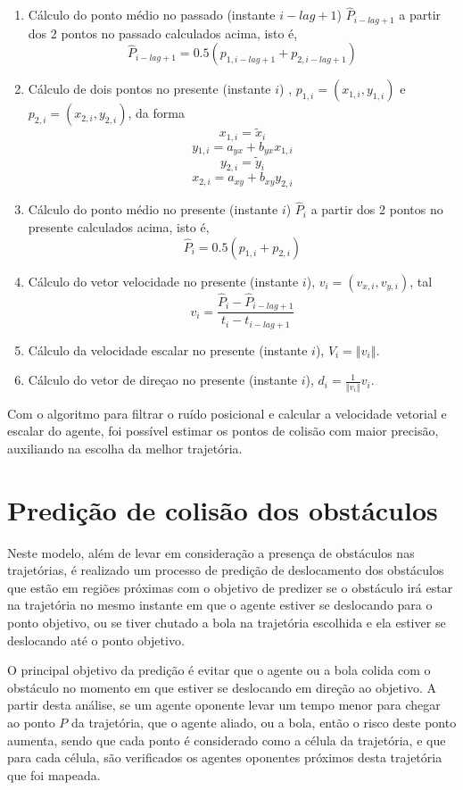 \begin{enumerate}
\begin{enumerate}
\item Cálculo do ponto médio no passado (instante $i-lag+1$) $\hat{P}_{i-lag+1}$
a partir dos 2 pontos no passado calculados acima, isto é,
\[
\hat{P}_{i-lag+1}=0.5\left(p_{1,i-lag+1}+p_{2,i-lag+1}\right)
\]

\item Cálculo de dois pontos no presente (instante $i$) , $p_{1,i}=\left(x_{1,i},y_{1,i}\right)$
e $p_{2,i}=\left(x_{2,i},y_{2,i}\right)$, da forma
\[
x_{1,i}=\tilde{x}_{i}
\]
\[
y{}_{1,i}=a_{yx}+b_{yx}x_{1,i}
\]
\[
y_{2,i}=\tilde{y}_{i}
\]
\[
x_{2,i}=a_{xy}+b_{xy}y_{2,i}
\]

\item Cálculo do ponto médio no presente (instante $i$) $\hat{P}_{i}$
a partir dos 2 pontos no presente calculados acima, isto é,
\[
\hat{P}_{i}=0.5\left(p_{1,i}+p_{2,i}\right)
\]

\item Cálculo do vetor velocidade no presente (instante $i$), $v_{i}=\left(v_{x,i},v_{y,i}\right)$,
tal 
\[
v_{i}=\frac{\hat{P}_{i}-\hat{P}_{i-lag+1}}{t_{i}-t_{i-lag+1}}
\]

\item Cálculo da velocidade escalar no presente (instante $i$), $V_{i}=\left\Vert v_{i}\right\Vert $.
\item Cálculo do vetor de direçao no presente (instante $i$), $d_{i}={\displaystyle \frac{1}{\left\Vert v_{i}\right\Vert }}v_{i}$.\end{enumerate}
\end{enumerate}


Com o algoritmo para filtrar o ruído posicional e calcular a velocidade vetorial e escalar do agente, foi possível estimar os 
pontos de colisão com maior precisão, auxiliando na escolha da melhor trajetória.

\section{Predição de colisão dos obstáculos}
\label{sec:calctrajetoria}
Neste modelo, além de levar em consideração a presença de obstáculos nas trajetórias, é realizado um processo de predição de 
deslocamento dos obstáculos que estão em regiões próximas com o objetivo de predizer se o obstáculo irá estar na trajetória 
no mesmo instante em que o agente estiver se deslocando para o ponto objetivo, ou se tiver chutado a bola na trajetória escolhida 
e ela estiver se deslocando até o ponto objetivo.

O principal objetivo da predição é evitar que o agente ou a bola colida com o obstáculo no momento em que estiver se deslocando 
em direção ao objetivo. A partir desta análise, se um agente oponente levar um tempo menor para chegar ao ponto $P$ da trajetória, 
que o agente aliado, ou a bola, então o risco deste ponto aumenta, sendo que cada ponto é considerado como a célula da trajetória, 
e que para cada célula, são verificados os agentes oponentes próximos desta trajetória que foi mapeada.

